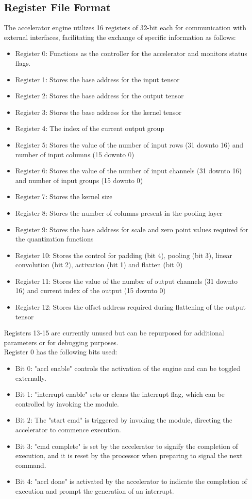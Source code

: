 \subsection{Register File Format}
The accelerator engine utilizes 16 registers of 32-bit each for communication with external interfaces, facilitating the exchange of specific information as follows:
\begin{itemize}
    \item Register 0: Functions as the controller for the accelerator and monitors status flags.
    \item Register 1: Stores the base address for the input tensor
    \item Register 2: Stores the base address for the output tensor
    \item Register 3: Stores the base address for the kernel tensor
    \item Register 4: The index of the current output group
    \item Register 5: Stores the value of the number of input rows (31 downto 16) and
number of input columns (15 downto 0)
    \item Register 6: Stores the value of the number of input channels (31 downto 16) and
number of input groups (15 downto 0)
    \item Register 7: Stores the kernel size
    \item Register 8: Stores the number of columns present in the pooling layer
    \item Register 9: Stores the base address for scale and zero point values required for the quantization functions
    \item Register 10: Stores the control for padding (bit 4), pooling (bit 3), linear convolution (bit 2), activation (bit 1) and flatten (bit 0)
    \item Register 11: Stores the value of the number of output channels (31 downto 16) and
current index of the output (15 downto 0)
    \item Register 12: Stores the offset address required during flattening of the output tensor
\end{itemize}
Registers 13-15 are currently unused but can be repurposed for additional parameters or for debugging purposes.\\
Register 0 has the following bits used:
\begin{itemize}
    \item Bit 0: "accl enable" controls the activation of the engine and can be toggled externally.
    \item Bit 1: "interrupt enable" sets or clears the interrupt flag, which can be controlled by invoking the module.
    \item Bit 2: The "start cmd" is triggered by invoking the module, directing the accelerator to commence execution.
    \item Bit 3: "cmd complete" is set by the accelerator to signify the completion of execution, and it is reset by the processor when preparing to signal the next command.
    \item Bit 4: "accl done" is activated by the accelerator to indicate the completion of execution and prompt the generation of an interrupt.
\end{itemize}
\newpage
